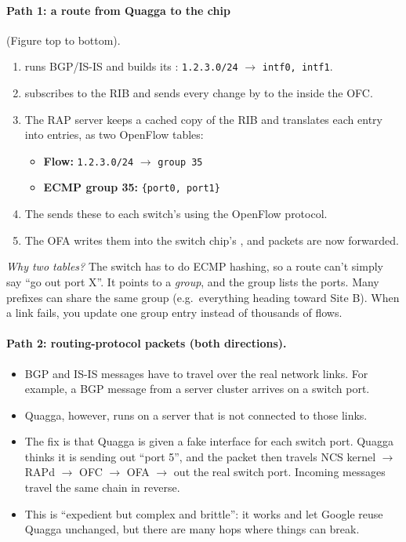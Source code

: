 \paragraph{Path 1: a route from Quagga to the chip} (Figure top to bottom).
\begin{enumerate}
\item {} runs BGP/IS-IS and builds its : \texttt{1.2.3.0/24} $\to$ \texttt{intf0, intf1}.
\item {} subscribes to the RIB and sends every change by  to the  inside the OFC.
\item The RAP server keeps a cached copy of the RIB and translates each entry into  entries, as two OpenFlow tables:
  \begin{itemize}
  \item \textbf{Flow:} \texttt{1.2.3.0/24} $\to$ \texttt{group 35}
  \item \textbf{ECMP group 35:} \texttt{\{port0, port1\}}
  \end{itemize}
\item The  sends these to each switch's  using the OpenFlow protocol.
\item The OFA writes them into the switch chip's , and packets are now forwarded.
\end{enumerate}
\emph{Why two tables?} The switch has to do ECMP hashing, so a route can't simply say ``go out port X''. It points to a \emph{group}, and the group lists the ports. Many prefixes can share the same group (e.g.\ everything heading toward Site B). When a link fails, you update one group entry instead of thousands of flows.

\paragraph{Path 2: routing-protocol packets (both directions).}
\begin{itemize}
\item BGP and IS-IS messages have to travel over the real network links. For example, a BGP message from a server cluster arrives on a switch port.
\item Quagga, however, runs on a server that is not connected to those links.
\item The fix is that Quagga is given a fake  interface for each switch port. Quagga thinks it is sending out ``port 5'', and the packet then travels NCS kernel $\to$ RAPd $\to$ OFC $\to$ OFA $\to$ out the real switch port. Incoming messages travel the same chain in reverse.
\item This is ``expedient but complex and brittle'': it works and let Google reuse Quagga unchanged, but there are many hops where things can break.
\end{itemize}

